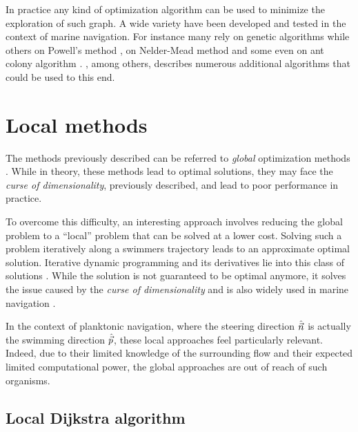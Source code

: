 In practice any kind of optimization algorithm can be used to minimize the exploration of such graph.
A wide variety have been developed and tested in the context of marine navigation.
For instance many rely on genetic algorithms \citep{avgouleas2014fuel, vettor2016development} while others on Powell's method \citep{kobayashi2017advanced}, on Nelder-Mead method \citep{pipchenko201120} and some even on ant colony algorithm \citep{tsou2013ant}.
\citet{brownlee2011clever}, among others, describes numerous additional algorithms that could be used to this end.

\section{Local methods}

The methods previously described can be referred to \textit{global} optimization methods \citep{todorov2009iterative}.
While in theory, these methods lead to optimal solutions, they may face the \textit{curse of dimensionality},  previously described, and lead to poor performance in practice.

To overcome this difficulty, an interesting approach involves reducing the global problem to a ``local'' problem that can be solved at a lower cost.
Solving such a problem iteratively along a swimmers trajectory leads to an approximate optimal solution.
Iterative dynamic programming and its derivatives lie into this class of solutions \citep{todorov2009iterative, luus2019iterative}.
While the solution is not guaranteed to be optimal anymore, it solves the issue caused by the \textit{curse of dimensionality} and is also widely used in marine navigation \citep{avgouleas2008optimal, avgouleas2014fuel}.

In the context  of planktonic navigation, where the steering direction $\hat{\vec{n}}$ is actually the swimming direction $\hat{\vec{p}}$, these local approaches feel particularly relevant.
Indeed, due to their limited knowledge of the surrounding flow and their expected limited computational power, the global approaches are out of reach of such organisms.

\subsection{Local Dijkstra algorithm}

